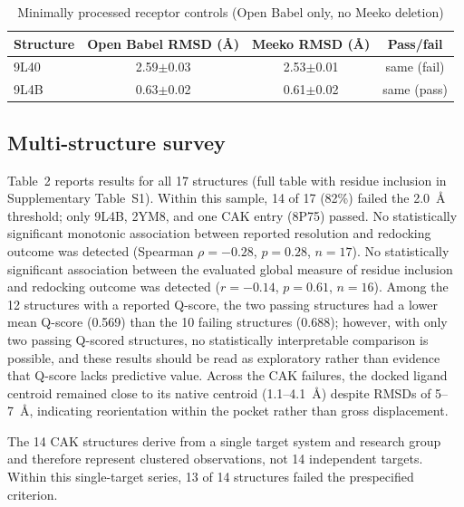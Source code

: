 \documentclass[global,twocolumn]{svjour}
\newcommand{\st}{\footnotesize\setlength{\tabcolsep}{3pt}}
\begin{document}
\begin{table}[t]
\centering
\caption{Minimally processed receptor controls (Open Babel only, no Meeko
deletion)}
\label{tab:receptorcontrols}
\st
\begin{tabular}{lccc}
\toprule
Structure & Open Babel RMSD (\AA{}) & Meeko RMSD (\AA{}) & Pass/fail \\
\midrule
9L40 & 2.59$\pm$0.03 & 2.53$\pm$0.01 & same (fail) \\
9L4B & 0.63$\pm$0.02 & 0.61$\pm$0.02 & same (pass) \\
\bottomrule
\end{tabular}
\end{table}

\subsection{Multi-structure survey}

Table~2 reports results for all 17 structures (full table with residue
inclusion in Supplementary Table~S1). Within this sample, 14 of 17 (82\%)
failed the 2.0~\AA{} threshold; only 9L4B, 2YM8, and one CAK entry (8P75)
passed. No statistically significant monotonic association between reported
resolution and redocking outcome was detected (Spearman $\rho=-0.28$,
$p=0.28$, $n=17$). No statistically significant association between the
evaluated global measure of residue inclusion and redocking outcome was
detected ($r=-0.14$, $p=0.61$, $n=16$). Among the 12 structures with a
reported Q-score, the two passing structures had a lower mean Q-score (0.569)
than the 10 failing structures (0.688); however, with only two passing
Q-scored structures, no statistically interpretable comparison is possible,
and these results should be read as exploratory rather than evidence that
Q-score lacks predictive value. Across the CAK failures, the docked ligand
centroid remained close to its native centroid (1.1--4.1~\AA{}) despite RMSDs
of 5--7~\AA{}, indicating reorientation within the pocket rather than gross
displacement.

The 14 CAK structures derive from a single target system and research group
and therefore represent clustered observations, not 14 independent targets.
Within this single-target series, 13 of 14 structures failed the prespecified
criterion.
\end{document}
